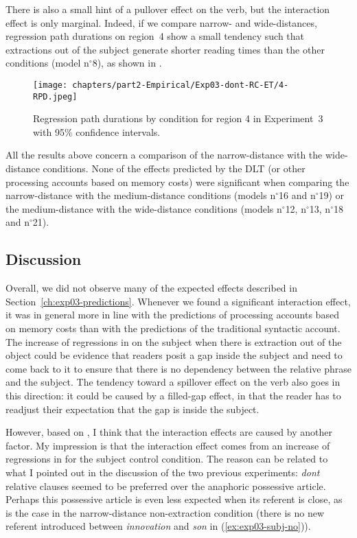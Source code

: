 There is also a small hint of a pullover effect on the verb, but the interaction effect is only marginal. Indeed, if we compare narrow- and wide-distances, regression path durations on region~4 show a small tendency such that extractions out of the subject generate shorter reading times than the other conditions (model n$^{\circ}$8), as shown in . 

\begin{figure}
    \centering
    \texttt{[image: chapters/part2-Empirical/Exp03-dont-RC-ET/4-RPD.jpeg]}
    \caption{Regression path durations by condition for region 4 in Experiment~3 with 95\% confidence intervals.}
    \label{fig:exp03-4-RPD-main}
\end{figure}

All the results above concern a comparison of the narrow-distance with the wide-distance conditions. None of the effects predicted by the DLT (or other processing accounts based on memory costs) were significant when comparing the narrow-distance with the  medium-distance conditions (models n$^{\circ}$16 and n$^{\circ}$19) or the medium-distance with the wide-distance conditions (models n$^{\circ}$12, n$^{\circ}$13, n$^{\circ}$18 and n$^{\circ}$21).

\subsection{Discussion}

Overall, we did not observe many of the expected effects described in Section~\ref{ch:exp03-predictions}. Whenever we found a significant interaction effect, it was in general more in line with the predictions of processing accounts based on memory costs than with the predictions of the traditional syntactic account. The increase of regressions in on the subject when there is extraction out of the object could be evidence that readers posit a gap inside the subject and need to come back to it to ensure that there is no dependency between the relative phrase and the subject. The tendency toward a spillover effect on the verb also goes in this direction: it could be caused by a filled-gap effect, in that the reader has to readjust their expectation that the gap is inside the subject.

However, based on , I think that the interaction effects are caused by another factor. My impression is that the interaction effect comes from an increase of regressions in for the subject control condition. The reason can be related to what I pointed out in the discussion of the two previous experiments: \emph{dont} relative clauses seemed to be preferred over the anaphoric possessive article. Perhaps this possessive article is even less expected when its referent is close, as is the case in the narrow-distance non-extraction condition (there is no new referent introduced between \emph{innovation} and \emph{son} in (\ref{ex:exp03-subj-no})). 

